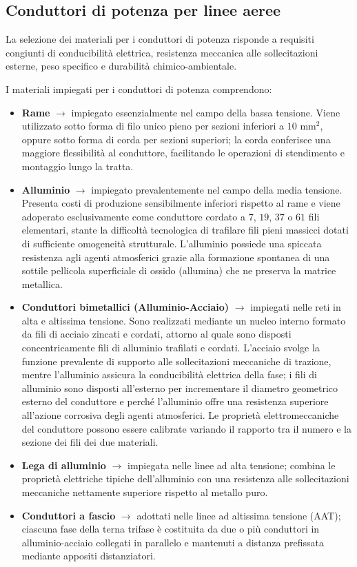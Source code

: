 \subsection{Conduttori di potenza per linee aeree}
La selezione dei materiali per i conduttori di potenza risponde a requisiti congiunti di conducibilità elettrica, resistenza meccanica alle sollecitazioni esterne, peso specifico e durabilità chimico-ambientale.

I materiali impiegati per i conduttori di potenza comprendono:
\begin{itemize}
    \item \textbf{Rame} $\rightarrow$ impiegato essenzialmente nel campo della bassa tensione. Viene utilizzato sotto forma di filo unico pieno per sezioni inferiori a $10\text{ mm}^2$, oppure sotto forma di corda per sezioni superiori; la corda conferisce una maggiore flessibilità al conduttore, facilitando le operazioni di stendimento e montaggio lungo la tratta.
    \item \textbf{Alluminio} $\rightarrow$ impiegato prevalentemente nel campo della media tensione. Presenta costi di produzione sensibilmente inferiori rispetto al rame e viene adoperato esclusivamente come conduttore cordato a $7$, $19$, $37$ o $61$ fili elementari, stante la difficoltà tecnologica di trafilare fili pieni massicci dotati di sufficiente omogeneità strutturale. L'alluminio possiede una spiccata resistenza agli agenti atmosferici grazie alla formazione spontanea di una sottile pellicola superficiale di ossido (allumina) che ne preserva la matrice metallica.
    \item \textbf{Conduttori bimetallici (Alluminio-Acciaio)} $\rightarrow$ impiegati nelle reti in alta e altissima tensione. Sono realizzati mediante un nucleo interno formato da fili di acciaio zincati e cordati, attorno al quale sono disposti concentricamente fili di alluminio trafilati e cordati. L'acciaio svolge la funzione prevalente di supporto alle sollecitazioni meccaniche di trazione, mentre l'alluminio assicura la conducibilità elettrica della fase; i fili di alluminio sono disposti all'esterno per incrementare il diametro geometrico esterno del conduttore e perché l'alluminio offre una resistenza superiore all'azione corrosiva degli agenti atmosferici. Le proprietà elettromeccaniche del conduttore possono essere calibrate variando il rapporto tra il numero e la sezione dei fili dei due materiali.
    \item \textbf{Lega di alluminio} $\rightarrow$ impiegata nelle linee ad alta tensione; combina le proprietà elettriche tipiche dell'alluminio con una resistenza alle sollecitazioni meccaniche nettamente superiore rispetto al metallo puro.
    \item \textbf{Conduttori a fascio} $\rightarrow$ adottati nelle linee ad altissima tensione (AAT); ciascuna fase della terna trifase è costituita da due o più conduttori in alluminio-acciaio collegati in parallelo e mantenuti a distanza prefissata mediante appositi distanziatori.
\end{itemize}

